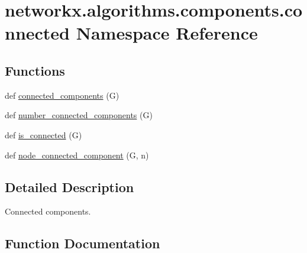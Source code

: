 \hypertarget{namespacenetworkx_1_1algorithms_1_1components_1_1connected}{}\section{networkx.\+algorithms.\+components.\+connected Namespace Reference}
\label{namespacenetworkx_1_1algorithms_1_1components_1_1connected}
\subsection*{Functions}
\begin{DoxyCompactItemize}
\item 
def \hyperlink{namespacenetworkx_1_1algorithms_1_1components_1_1connected_aa1714f720dc48d8d9aecb4047f6fd5b4}{connected\+\_\+components} (G)
\item 
def \hyperlink{namespacenetworkx_1_1algorithms_1_1components_1_1connected_ab49892fb7b043be0c8f1d453c66d0c68}{number\+\_\+connected\+\_\+components} (G)
\item 
def \hyperlink{namespacenetworkx_1_1algorithms_1_1components_1_1connected_a9d97441f041c2b3cdd180c70c5f9b3b5}{is\+\_\+connected} (G)
\item 
def \hyperlink{namespacenetworkx_1_1algorithms_1_1components_1_1connected_aae266adc38aec6076628b3d894ae63cb}{node\+\_\+connected\+\_\+component} (G, n)
\end{DoxyCompactItemize}


\subsection{Detailed Description}
\begin{DoxyVerb}Connected components.\end{DoxyVerb}
 

\subsection{Function Documentation}
\mbox{\label{namespacenetworkx_1_1algorithms_1_1components_1_1connected_aa1714f720dc48d8d9aecb4047f6fd5b4}} 
